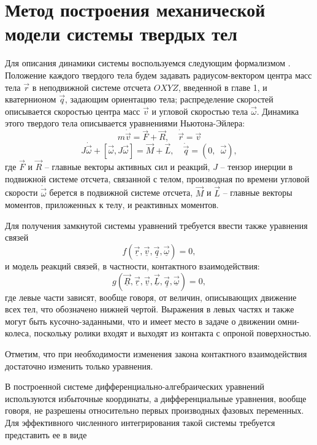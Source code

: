 \section{Метод построения механической модели системы твердых тел}

Для описания динамики системы воспользуемся следующим формализмом \cite{Kosenko2006,Kosenko2007,KosenkoQuaternionRus}. Положение каждого твердого тела будем задавать радиусом-вектором центра масс тела $\vec{r}$ в неподвижной системе отсчета $OXYZ$, введенной в главе 1, и кватернионом $\vec{q}$, задающим ориентацию тела; распределение скоростей описывается скоростью центра масс $\vec{v}$ и угловой скоростью тела $\vec{\omega}$.
Динамика этого твердого тела описывается уравнениями Ньютона-Эйлера:
$$ m\dot{\vec{v}} = \vec{F} + \vec{R}, \quad \dot{\vec{r}} = \vec{v} $$
$$ J\dot{\vec{\omega}} + [ \vec{\omega}, J\vec{\omega} ] = \vec{M} + \vec{L}, \quad \dot{\vec{q}} = (0, \enspace \vec{\omega}), $$
где $\vec{F}$ и $\vec{R}$ -- главные векторы активных сил и реакций, $J$ -- тензор инерции в подвижной системе отсчета, связанной с телом, производная по времени угловой скорости $\dot{\vec{\omega}}$ берется в подвижной системе отсчета, $\vec{M}$ и $\vec{L}$ -- главные векторы моментов, приложенных к телу, и реактивных моментов.

Для получения замкнутой системы уравнений требуется ввести также уравнения связей 
\begin{equation}\label{eq:mo_cstr}
    f(\vec{\underline{r}}, \vec{\underline{v}}, \vec{\underline{q}}, \vec{\underline{\omega}}) = 0,
\end{equation}
и модель реакций связей, в частности, контактного взаимодействия:
\begin{equation}\label{eq:mo_reac}
    g(\vec{\underline{R}}, \vec{\underline{r}}, \vec{\underline{v}}, \vec{\underline{L}}, \vec{\underline{q}}, \vec{\underline{\omega}}) = 0,
\end{equation}
где левые части зависят, вообще говоря, от величин, описывающих движение всех тел, что обозначено нижней чертой. Выражения в левых частях и также могут быть кусочно-заданными, что и имеет место в задаче о движении омни-колеса, поскольку ролики входят и выходят из контакта с опроной поверхностью.

Отметим, что при необходимости изменения закона контактного взаимодействия достаточно изменить только уравнения.

В построенной системе дифференциально-алгебраических уравнений используются избыточные координаты, а дифференциальные уравнения, вообще говоря, не разрешены относительно первых производных фазовых переменных. Для эффективного численного интегрирования такой системы требуется \cite{kosenkoBook2012modelirovanie} представить ее в виде

